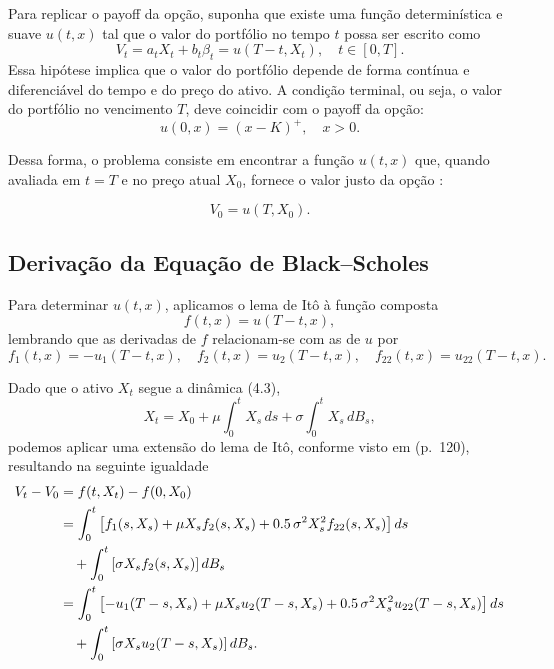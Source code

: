 \documentclass[12pt,openright,oneside,a4paper]{abntex2}
\numberwithin{equation}{section}
\begin{document}
Para replicar o payoff da opção, suponha que existe uma função determinística e suave $u(t,x)$ tal que o valor do portfólio no tempo $t$ possa ser escrito como
\begin{equation}
    V_t = a_t X_t + b_t \beta_t = u(T - t, X_t), \quad t \in [0,T].
\end{equation}
Essa hipótese implica que o valor do portfólio depende de forma contínua e diferenciável do tempo e do preço do ativo. A condição terminal, ou seja, o valor do portfólio no vencimento $T$, deve coincidir com o payoff da opção:
\begin{equation}
    u(0, x) = (x - K)^+, \quad x > 0.
\end{equation}

Dessa forma, o problema consiste em encontrar a função $u(t,x)$ que, quando avaliada em $t = T$ e no preço atual $X_0$, fornece o valor justo da opção \parencite [p.~172] {Mikosh}:

\begin{equation}
    V_0 = u(T, X_0).
\end{equation}

\subsection{Derivação da Equação de Black--Scholes}

Para determinar $u(t,x)$, aplicamos o lema de Itô à função composta
\[
f(t,x)=u(T-t,x),
\]
lembrando que as derivadas de $f$ relacionam-se com as de $u$ por
\[
f_1(t,x) = -u_1(T-t,x), \quad f_2(t,x) = u_2(T-t,x), \quad f_{22}(t,x)= u_{22}(T-t,x).
\]

Dado que o ativo $X_t$ segue a dinâmica (4.3),
\begin{equation}
    X_t = X_0 + \mu \int_0^t X_s \, ds + \sigma \int_0^t X_s \, dB_s,
\end{equation}
podemos aplicar uma extensão do lema de Itô, conforme visto em \textcite{Mikosh} (p.~120), resultando na seguinte igualdade
\begin{align}
    V_t - V_0 &= f(t, X_t) - f(0, X_0) \notag \\
    &= \int_0^t \left[ f_1(s, X_s) + \mu X_s f_2(s, X_s) 
       + 0.5 \, \sigma^2 X_s^2 f_{22}(s, X_s) \right] ds \notag \\
    &\quad + \int_0^t \left[ \sigma X_s f_2(s, X_s) \right] dB_s \notag \\
    &= \int_0^t \left[ -u_1(T - s, X_s) + \mu X_s u_2(T - s, X_s) 
       + 0.5 \, \sigma^2 X_s^2 u_{22}(T - s, X_s) \right] ds \notag \\
    &\quad + \int_0^t \left[ \sigma X_s u_2(T - s, X_s) \right] dB_s. 
\end{align}
\end{document}
